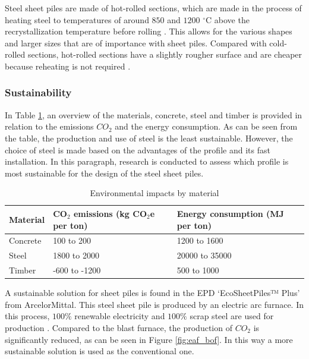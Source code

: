 Steel sheet piles are made of hot-rolled sections, which are made in the process of heating steel to temperatures of around $850$ and $1200$ $^{\circ}$C  above the recrystallization temperature before rolling \autocite{samarasekeraHotRolling2001}. This allows for the various shapes and larger sizes that are of importance with sheet piles. Compared with cold-rolled sections, hot-rolled sections have a slightly rougher surface and are cheaper because reheating is not required \autocite{chesterfieldWhatDifferenceHot}. 

\subsubsection{Sustainability}

In Table \ref{tab:env_impacts}, an overview of the materials, concrete, steel and timber is provided in relation to the emissions $CO_{2}$ and the energy consumption. As can be seen from the table, the production and use of steel is the least sustainable. However, the choice of steel is made based on the advantages of the profile and its fast installation. In this paragraph, research is conducted to assess which profile is most sustainable for the design of the steel sheet piles.

\begin{table}[H]
  \centering
  \caption{Environmental impacts by material \autocite{schipper81MaterialCharacteristics}}
  \label{tab:env_impacts}
  \small
  \setlength{\tabcolsep}{6pt}
  \renewcommand{\arraystretch}{1.15}
  \begin{tabularx}{\linewidth}{@{}l l l@{}}
    \toprule
    Material &
    CO$_2$ emissions (kg CO$_2$e per ton) &
    Energy consumption (MJ per ton) \\
    \midrule
    Concrete & 100 to 200 & 1200 to 1600 \\
    Steel    & 1800 to 2000 & 20000 to 35000 \\
    Timber   & -600 to -1200 & 500 to 1000 \\
    \bottomrule
  \end{tabularx}
\end{table}

A sustainable solution for sheet piles is found in the EPD ‘EcoSheetPiles™ Plus’ from ArcelorMittal. This steel sheet pile is produced by an electric arc furnace. In this process, $100\%$ renewable electricity and $100\%$ scrap steel are used for production \autocite{arcelormittalGuidelinesSustainabilitySteel2024}. Compared to the blast furnace, the production of $CO_{2}$ is significantly reduced, as can be seen in Figure \ref{fig:eaf_bof}. In this way a more sustainable solution is used as the conventional one.

